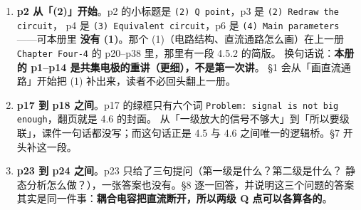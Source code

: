 \documentclass[11pt]{ctexart}
\begin{document}
\begin{enumerate}

\item \textbf{p2 从「(2)」开始}。p2 的小标题是 \texttt{(2) Q point}，p3 是 \texttt{(2) Redraw the circuit}，
p4 是 \texttt{(3) Equivalent circuit}，p6 是 \texttt{(4) Main parameters}——可本册里
\textbf{没有 (1)}。那个 (1)（电路结构、直流通路怎么画）在上一册
\texttt{Chapter Four-4} 的 p20--p38 里，那里有一段 4.5.2 的简版。
换句话说：\textbf{本册的 p1--p14 是共集电极的重讲（更细），不是第一次讲}。
§1 会从「画直流通路」开始把 (1) 补出来，读者不必回头翻上一册。

\item \textbf{p17 到 p18 之间}。p17 的绿框只有六个词
\texttt{Problem: signal is not big enough}，翻页就是 4.6 的封面。
从「一级放大的信号不够大」到「所以要级联」，课件一句话都没写；而这句话正是
4.5 与 4.6 之间唯一的逻辑桥。§7 开头补这一段。

\item \textbf{p23 到 p24 之间}。p23 只给了三句提问（第一级是什么？第二级是什么？
静态分析怎么做？），一张答案也没有。§8 逐一回答，并说明这三个问题的答案
其实是同一件事：\textbf{耦合电容把直流断开，所以两级 Q 点可以各算各的}。

\end{enumerate}

\end{document}
